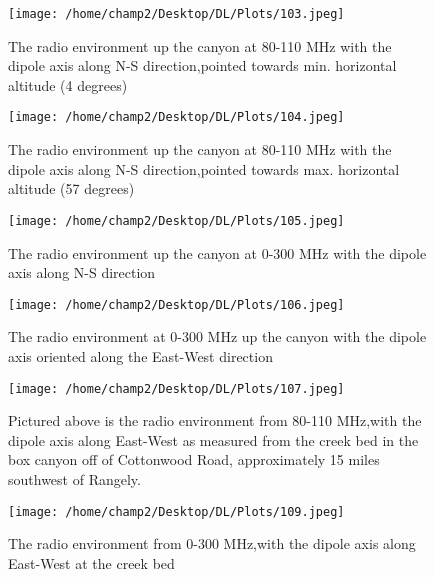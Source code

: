 \documentclass[11pt]{article}
\begin{document}
\begin{figure}
	\begin{center}
	\texttt{[image: /home/champ2/Desktop/DL/Plots/103.jpeg]}
	\end{center}
	\caption{
		The radio environment up the canyon at 80-110 MHz with the dipole axis along N-S direction,pointed towards min. horizontal altitude (4 degrees) 
	}
\end{figure}

\begin{figure}
	\begin{center}
	\texttt{[image: /home/champ2/Desktop/DL/Plots/104.jpeg]}
	\end{center}
	\caption{
		The radio environment up the canyon at 80-110 MHz with the dipole axis along N-S direction,pointed towards max. horizontal altitude (57 degrees) 
	}
\end{figure}

\begin{figure}
	\begin{center}
	\texttt{[image: /home/champ2/Desktop/DL/Plots/105.jpeg]}
	\end{center}
	\caption{
		The radio environment up the canyon at 0-300 MHz with the dipole axis along N-S direction
	}
\end{figure}


\begin{figure}
	\begin{center}
	\texttt{[image: /home/champ2/Desktop/DL/Plots/106.jpeg]}
	\end{center}
	\caption{
	The radio environment at 0-300 MHz up the canyon with the dipole axis oriented along the East-West direction  
	}
\end{figure}
	
\begin{figure}
    \begin{center}
    \texttt{[image: /home/champ2/Desktop/DL/Plots/107.jpeg]}
    \end{center}
    \caption{
        Pictured above is the radio environment from 80-110 MHz,with the dipole axis along East-West as measured 
        from the creek bed in the box canyon off of Cottonwood Road, 
        approximately 15 miles southwest of Rangely.
    }
    \label{fig:107}
\end{figure}

\begin{figure}
    \begin{center}
    \texttt{[image: /home/champ2/Desktop/DL/Plots/109.jpeg]}
    \end{center}
    \caption{
        The radio environment from 0-300 MHz,with the dipole axis along East-West at the creek bed 
    }
    \label{fig:109}
\end{figure}
\end{document}
